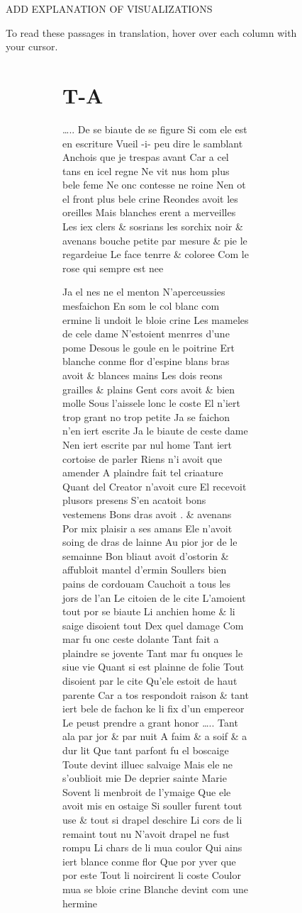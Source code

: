 \documentclass[
  letterpaper,
  DIV=11,
  numbers=noendperiod,
  oneside]{scrreprt}
\begin{document}
\begin{figure}
ADD EXPLANATION OF VISUALIZATIONS

To read these passages in translation, hover over each column with your
cursor.

\begin{figure}

\begin{figure}

\begin{minipage}{0.20\linewidth}

\section{T-A}\label{t-a-1}

\ldots.. De se biaute de se figure Si com ele est en escriture Vueil -i-
peu dire le samblant Anchois que je trespas avant Car a cel tans en icel
regne Ne vit nus hom plus bele feme Ne onc contesse ne roine Nen ot el
front plus bele crine Reondes avoit les oreilles Mais {blanches} erent a
merveilles {Les iex {clers} \& sosrians} {les sorchix {noir} \& avenans}
bouche petite par mesure \& pie le regardeiue Le face tenrre \&
{coloree} {Com le rose qui sempre est nee}

Ja el nes ne el menton N'aperceussies mesfaichon En som le col {blanc
com ermine} li undoit le {bloie} crine Les mameles de cele dame
N'estoient menrres d'une pome Desous le goule en le poitrine Ert
{blanche conme flor d'espine} {blans bras} avoit \& {blances mains} Les
dois reons grailles \& plains Gent cors avoit \& bien molle Sous
l'aissele lonc le coste El n'iert trop grant no trop petite Ja se
faichon n'en iert escrite Ja le biaute de ceste dame Nen iert escrite
par nul home Tant iert cortoise de parler Riens n'i avoit que amender A
plaindre fait tel criaature Quant del Creator n'avoit cure El recevoit
plusors presens S'en acatoit bons vestemens Bons dras avoit . \& avenans
Por mix plaisir a ses amans Ele n'avoit soing de dras de lainne Au pior
jor de le semainne Bon bliaut avoit {d'ostorin} \& affubloit mantel
d'ermin Soullers {bien pains} de cordouam Cauchoit a tous les jors de
l'an Le citoien de le cite L'amoient tout por se biaute Li anchien home
\& li saige disoient tout Dex quel damage Com mar fu onc ceste dolante
Tant fait a plaindre se jovente Tant mar fu onques le siue vie Quant si
est plainne de folie Tout disoient par le cite Qu'ele estoit de haut
parente Car a tos respondoit raison \& tant iert bele de fachon ke li
fix d'un empereor Le peust prendre a grant honor \ldots.. Tant ala par
jor \& par nuit A faim \& a soif \& a dur lit Que tant parfont fu el
boscaige Toute devint illuec salvaige Mais ele ne s'oublioit mie De
deprier sainte Marie Sovent li menbroit de l'ymaige Que ele avoit mis en
ostaige Si souller furent tout use \& tout si drapel deschire {Li cors
de li remaint tout nu} {N'avoit drapel ne fust rompu} Li chars de li
{mua coulor} Qui ains iert {blance conme flor} Que por yver que por este
Tout li {noircirent} li coste {Coulor mua se bloie crine} {Blanche
devint com une hermine}


\end{minipage}
\end{figure}
\end{figure}
\end{figure}
\end{document}
